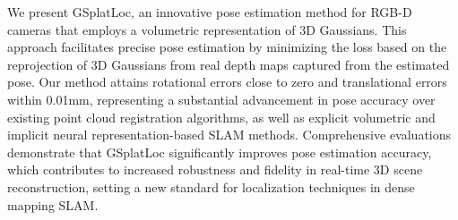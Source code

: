 \documentclass[twocolumn]{article} %
\begin{document}
We present GSplatLoc, an innovative pose estimation method for RGB-D
cameras that employs a volumetric representation of 3D Gaussians. This
approach facilitates precise pose estimation by minimizing the loss
based on the reprojection of 3D Gaussians from real depth maps captured
from the estimated pose. Our method attains rotational errors close to
zero and translational errors within 0.01mm, representing a substantial
advancement in pose accuracy over existing point cloud registration
algorithms, as well as explicit volumetric and implicit neural
representation-based SLAM methods. Comprehensive evaluations demonstrate
that GSplatLoc significantly improves pose estimation accuracy, which
contributes to increased robustness and fidelity in real-time 3D scene
reconstruction, setting a new standard for localization techniques in
dense mapping SLAM.
\end{document}
